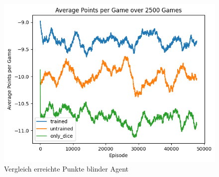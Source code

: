\begin{figure}[!h]
    \centering
    \includegraphics[scale=0.5]{Bilder/points_onlydice.png}
    \caption{Vergleich erreichte Punkte blinder Agent}
    \label{fig:onlydice_points}
\end{figure}
